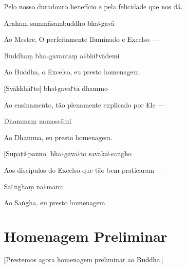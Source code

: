 \begin{english}
Pelo nosso duradouro benefício e pela felicidade que nos dá.
\end{english}

\clearpage

Arahaṃ sammāsambuddho bha꜕gavā

\begin{english}
Ao Mestre, O perfeitamente Iluminado e Excelso ---
\end{english}

Buddhaṃ bha꜕gavantaṃ a꜕bhi꜓vādemi

\begin{english}
  Ao Buddha, o Excelso, eu presto homenagem.
\end{english}

[Svākkhā꜓to] bha꜕gava꜓tā dhammo

\begin{english}
 Ao ensinamento, tão plenamente explicado por Ele ---
\end{english}

Dhammaṃ namassāmi

\begin{english}
  Ao Dhamma, eu presto homenagem.
\end{english}

[Supaṭi꜕panno] bha꜕gava꜕to sāvaka꜕saṅgho

\begin{english}
Aos discípulos do Excelso que tão bem praticaram ---
\end{english}

Sa꜓ṅghaṃ na꜕māmi

\begin{english}
  Ao Saṅgha, eu presto homenagem.
\end{english}

\chapter{Homenagem Preliminar}

\begin{leader}
\end{leader}

\begin{english}
  [Prestemos agora homenagem preliminar ao Buddha.]
\end{english}

\vspace{\baselineskip}

